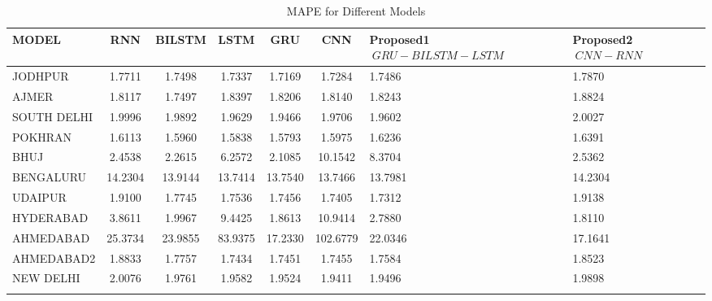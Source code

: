 \documentclass[a4paper,fleqn]{cas-sc}
\begin{document}
    \begin{table}[!ht]
    \centering
    \caption{MAPE  for Different Models}
    \begin{tabular}{|l|c|c|c|c|c|p{}|p{}|}
    \hline
    \textbf{MODEL} & \textbf{RNN} & \textbf{BILSTM} & \textbf{LSTM} & \textbf{GRU} & \textbf{CNN} &\textbf{Proposed1 \(\ GRU-BILSTM-LSTM \)\ } & \textbf{Proposed2 \(\ CNN-RNN\)\ } \\ \hline
    JODHPUR & 1.7711 & 1.7498 & 1.7337 & 1.7169 & 1.7284 & 1.7486 & 1.7870 \\ \hline
    AJMER & 1.8117 & 1.7497 & 1.8397 & 1.8206 & 1.8140 & 1.8243 & 1.8824 \\ \hline
    SOUTH DELHI & 1.9996 & 1.9892 & 1.9629 & 1.9466 & 1.9706 & 1.9602 & 2.0027 \\ \hline
    POKHRAN & 1.6113 & 1.5960 & 1.5838 & 1.5793 & 1.5975 & 1.6236 & 1.6391 \\ \hline
    BHUJ & 2.4538 & 2.2615 & 6.2572 & 2.1085 & 10.1542 & 8.3704 & 2.5362 \\ \hline
    BENGALURU & 14.2304 & 13.9144 & 13.7414 & 13.7540 & 13.7466 & 13.7981 & 14.2304 \\ \hline
    UDAIPUR & 1.9100 & 1.7745 & 1.7536 & 1.7456 & 1.7405 & 1.7312 & 1.9138 \\ \hline
    HYDERABAD & 3.8611 & 1.9967 & 9.4425 & 1.8613 & 10.9414 & 2.7880 & 1.8110 \\ \hline
    AHMEDABAD & 25.3734 & 23.9855 & 83.9375 & 17.2330 & 102.6779 & 22.0346 & 17.1641 \\ \hline
    AHMEDABAD2 & 1.8833 & 1.7757 & 1.7434 & 1.7451 & 1.7455 & 1.7584 & 1.8523 \\ \hline
    NEW DELHI & 2.0076 & 1.9761 & 1.9582 & 1.9524 & 1.9411 & 1.9496 & 1.9898 \\ \hline
    \label{}
    \end{tabular}
    \end{table}
    
    
    
\end{document}
